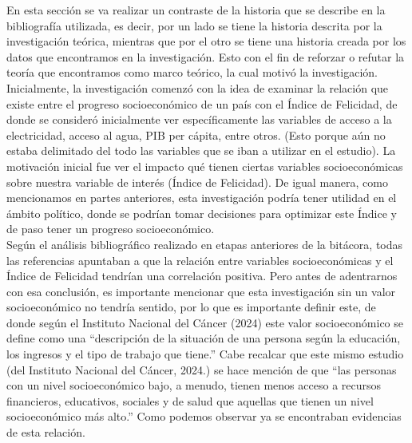 En esta sección se va realizar un contraste de la historia que se describe en la bibliografía utilizada, es decir, por un lado se tiene la historia descrita por la investigación teórica, mientras que por el otro se tiene una historia creada por los datos que encontramos en la investigación. Esto con el fin de reforzar o refutar la teoría que encontramos como marco teórico, la cual motivó la investigación.\\

Inicialmente, la investigación comenzó con la idea de examinar la relación que existe entre el progreso socioeconómico de un país con el Índice de Felicidad, de donde se consideró inicialmente ver específicamente las variables de acceso a la electricidad, acceso al agua, PIB per cápita, entre otros. (Esto porque aún no estaba delimitado del todo las variables que se iban a utilizar en el estudio). La motivación inicial fue ver el impacto qué tienen ciertas variables socioeconómicas sobre nuestra variable de interés (Índice de Felicidad). De igual manera, como mencionamos en partes anteriores, esta investigación podría tener utilidad en el ámbito político, donde se podrían tomar decisiones para optimizar este Índice y de paso tener un progreso socioeconómico.\\

Según el análisis bibliográfico realizado en etapas anteriores de la bitácora, todas las referencias apuntaban a que la relación entre variables socioeconómicas y el Índice de Felicidad tendrían una correlación positiva. Pero antes de adentrarnos con esa conclusión, es importante mencionar que esta investigación sin un valor socioeconómico no tendría sentido, por lo que es importante definir este, de donde según el Instituto Nacional del Cáncer (2024) este valor socioeconómico se define como una ``descripción de la situación de una persona según la educación, los ingresos y el tipo de trabajo que tiene.'' Cabe recalcar que este mismo estudio (del Instituto Nacional del Cáncer, 2024.) se hace mención de que ``las personas con un nivel socioeconómico bajo, a menudo, tienen menos acceso a recursos financieros, educativos, sociales y de salud que aquellas que tienen un nivel socioeconómico más alto.'' Como podemos observar ya se encontraban evidencias de esta relación. \\

